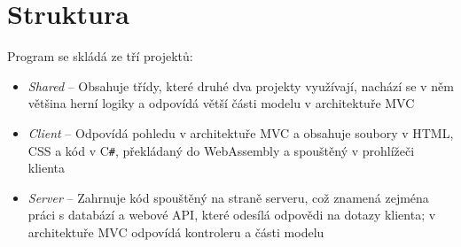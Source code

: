 \documentclass[a4paper,12pt]{article}
\def\CS{C\texttt{\#}}
\begin{document}
\section{Struktura}
Program se skládá ze tří projektů:
\begin{itemize}
\item\textit{Shared} -- Obsahuje třídy, které druhé dva projekty využívají, nachází se v něm většina herní logiky a odpovídá větší části modelu v architektuře MVC\cite{mvc}
\item\textit{Client} -- Odpovídá pohledu v architektuře MVC a obsahuje soubory v HTML, CSS a kód v  \CS{}, překládaný do WebAssembly a spouštěný v prohlížeči klienta
\item\textit{Server} -- Zahrnuje kód spouštěný na straně serveru, což znamená zejména práci s databází a webové API, které odesílá odpovědi na dotazy klienta; v architektuře MVC odpovídá kontroleru a části modelu
\end{itemize}
\newpage
\printbibliography[heading=bibintoc, title={Použitá literatura}]
\end{document}
